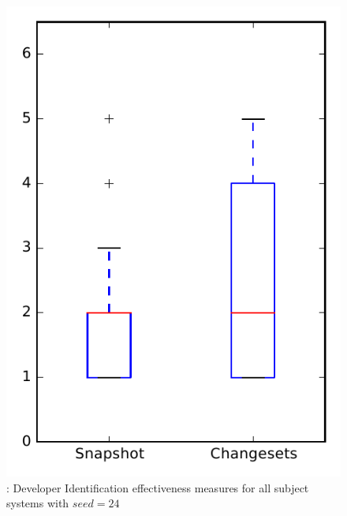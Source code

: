 
\begin{figure}
\centering
\includegraphics[height=0.4\textheight]{figures/dit_seed/rq1_overview_24}
\caption{\rtwo: Developer Identification effectiveness measures for all subject systems with $seed=24$}
\label{fig:dit_seed:rq1:overview}
\end{figure}
